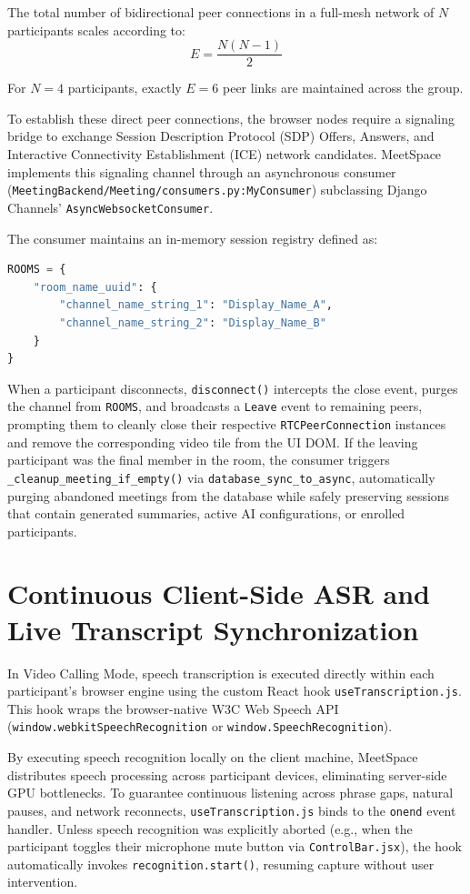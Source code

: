 \documentclass[12pt,oneside,letterpaper]{report}
\numberwithin{equation}{chapter} %
\begin{document}
The total number of bidirectional peer connections in a full-mesh network of $N$ participants scales according to:
\begin{equation}
E = \frac{N(N - 1)}{2}
\label{eq:mesh_edges}
\end{equation}

For $N = 4$ participants, exactly $E = 6$ peer links are maintained across the group.

To establish these direct peer connections, the browser nodes require a signaling bridge to exchange Session Description Protocol (SDP) Offers, Answers, and Interactive Connectivity Establishment (ICE) network candidates. MeetSpace implements this signaling channel through an asynchronous consumer (\texttt{MeetingBackend/Meeting/consumers.py:MyConsumer}) subclassing Django Channels' \texttt{AsyncWebsocketConsumer}.

The consumer maintains an in-memory session registry defined as:
\begin{lstlisting}[language=Python]
ROOMS = {
    "room_name_uuid": {
        "channel_name_string_1": "Display_Name_A",
        "channel_name_string_2": "Display_Name_B"
    }
}
\end{lstlisting}

When a participant disconnects, \texttt{disconnect()} intercepts the close event, purges the channel from \texttt{ROOMS}, and broadcasts a \texttt{Leave} event to remaining peers, prompting them to cleanly close their respective \texttt{RTCPeerConnection} instances and remove the corresponding video tile from the UI DOM. If the leaving participant was the final member in the room, the consumer triggers \texttt{\_cleanup\_meeting\_if\_empty()} via \texttt{database\_sync\_to\_async}, automatically purging abandoned meetings from the database while safely preserving sessions that contain generated summaries, active AI configurations, or enrolled participants.

\section{Continuous Client-Side ASR and Live Transcript Synchronization}
In Video Calling Mode, speech transcription is executed directly within each participant's browser engine using the custom React hook \texttt{useTranscription.js}. This hook wraps the browser-native W3C Web Speech API (\texttt{window.webkitSpeechRecognition} or \texttt{window.SpeechRecognition}).

By executing speech recognition locally on the client machine, MeetSpace distributes speech processing across participant devices, eliminating server-side GPU bottlenecks. To guarantee continuous listening across phrase gaps, natural pauses, and network reconnects, \texttt{useTranscription.js} binds to the \texttt{onend} event handler. Unless speech recognition was explicitly aborted (e.g., when the participant toggles their microphone mute button via \texttt{ControlBar.jsx}), the hook automatically invokes \texttt{recognition.start()}, resuming capture without user intervention.
\end{document}
